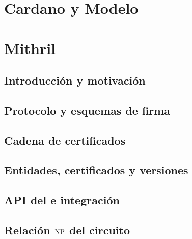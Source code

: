 \documentclass[11pt,a4paper,twoside]{tesis}
\begin{document}


\chapter{Cardano y Modelo \eUTxO}
\label{chap:cardano-y-modelo-eutxo}



\chapter{Mithril}
\label{chap:mithril}

\section{Introducción y motivación}
\label{sec:mithril-introduccion-y-motivacion}



\section{Protocolo \STM y esquemas de firma}
\label{sec:mithril-stm-protocol}



\section{Cadena de certificados}
\label{sec:mithril-cadena-de-certificados}



\section{Entidades, certificados y versiones}
\label{sec:mithril-entidades-certificados-y-versiones}



\section{API del \MithrilAggregator e integración}
\label{sec:mithril-api-del-mithrilaggregator-e-integracion}



\section{Relación \texorpdfstring{\(\mathrm{NP}\)}{NP} del circuito \STM}
\label{sec:mithril-relacion-np-del-circuito-stm}
\end{document}
